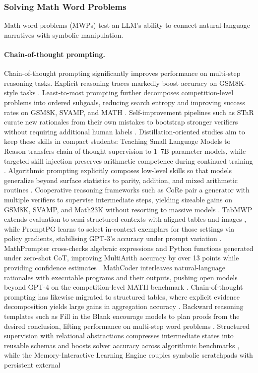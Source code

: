\documentclass[acmsmall,anonymous]{acmart}
\begin{document}
\subsubsection{Solving Math Word Problems}\label{sec:mwp}
Math word problems (MWPs) test an LLM’s ability to connect natural-language narratives with symbolic manipulation.  

\paragraph{Chain-of-thought prompting.}
Chain-of-thought prompting significantly improves performance on multi-step reasoning tasks.
Explicit reasoning traces markedly boost accuracy on GSM8K-style tasks \cite{wei2022chain}.  Least-to-most prompting further decomposes competition-level problems into ordered subgoals, reducing search entropy and improving success rates on GSM8K, SVAMP, and MATH \cite{zhou-2023-least}.  Self-improvement pipelines such as STaR curate new rationales from their own mistakes to bootstrap stronger verifiers without requiring additional human labels \cite{zelikman-2022-star}.  Distillation-oriented studies aim to keep these skills in compact students: Teaching Small Language Models to Reason transfers chain-of-thought supervision to 1–7B parameter models, while targeted skill injection preserves arithmetic competence during continued training \cite{magister-2023-teaching,sharma-2022-skill-injection}.  Algorithmic prompting explicitly composes low-level skills so that models generalize beyond surface statistics to parity, addition, and mixed arithmetic routines \cite{zhou-2022-teaching-algorithmic}.  Cooperative reasoning frameworks such as CoRe pair a generator with multiple verifiers to supervise intermediate steps, yielding sizeable gains on GSM8K, SVAMP, and Math23K without resorting to massive models \cite{zhu-2023-core}.  TabMWP extends evaluation to semi-structured contexts with aligned tables and images \cite{lu-2022-tabmwp}, while PromptPG learns to select in-context exemplars for those settings via policy gradients, stabilising GPT-3's accuracy under prompt variation \cite{lu-2023-dynamic-prompt}.  MathPrompter cross-checks algebraic expressions and Python functions generated under zero-shot CoT, improving MultiArith accuracy by over 13 points while providing confidence estimates \cite{imani-2023-mathprompter}.  MathCoder interleaves natural-language rationales with executable programs and their outputs, pushing open models beyond GPT-4 on the competition-level MATH benchmark \cite{wang-2023-mathcoder}.  Chain-of-thought prompting has likewise migrated to structured tables, where explicit evidence decomposition yields large gains in aggregation accuracy \cite{zheng-2023-tabular-cot}.  Backward reasoning templates such as Fill in the Blank encourage models to plan proofs from the desired conclusion, lifting performance on multi-step word problems \cite{deb-2024-backward-reasoning}.  Structured supervision with relational abstractions compresses intermediate states into reusable schemas and boosts solver accuracy across algorithmic benchmarks \cite{nam-2022-relational-abstractions}, while the Memory-Interactive Learning Engine couples symbolic scratchpads with persistent external 
\end{document}
